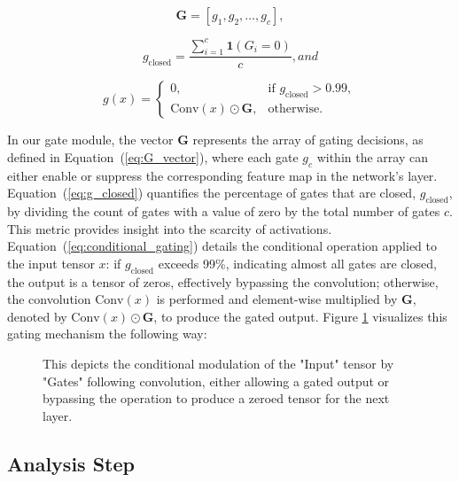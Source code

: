 \documentclass[runningheads]{llncs}
\begin{document}
\begin{equation}
\mathbf{G} = [g_1, g_2, \ldots, g_c], \label{eq:G_vector}
\end{equation}

\begin{equation}
g_{\text{closed}} = \frac{\sum_{i=1}^{c} \mathbf{1}(G_i = 0)}{c}, and \label{eq:g_closed}
\end{equation}

\begin{equation}
g(x) = 
\begin{cases} 
0, & \text{if } g_{\text{closed}} > 0.99, \\
\text{Conv}(x) \odot \mathbf{G}, & \text{otherwise}.
\end{cases} \label{eq:conditional_gating}
\end{equation}

In our gate module, the vector \(\mathbf{G}\) represents the array of gating decisions, as defined in Equation~(\ref{eq:G_vector}), where each gate \(g_c\) within the array can either enable or suppress the corresponding feature map in the network’s layer. Equation~(\ref{eq:g_closed}) quantifies the percentage of gates that are closed, \(g_{\text{closed}}\), by dividing the count of gates with a value of zero by the total number of gates \(c\). This metric provides insight into the scarcity of activations. Equation~(\ref{eq:conditional_gating}) details the conditional operation applied to the input tensor \(x\): if \(g_{\text{closed}}\) exceeds 99\%, indicating almost all gates are closed, the output is a tensor of zeros, effectively bypassing the convolution; otherwise, the convolution \(\text{Conv}(x)\) is performed and element-wise multiplied by \(\mathbf{G}\), denoted by \(\text{Conv}(x) \odot \mathbf{G}\), to produce the gated output. Figure \ref{fig:gating_mechanism} visualizes this gating mechanism the following way:

\begin{figure}[ht]
\centering

\caption{This depicts the conditional modulation of the "Input" tensor by "Gates" following convolution, either allowing a gated output or bypassing the operation to produce a zeroed tensor for the next layer.}
\label{fig:gating_mechanism}
\end{figure}

\subsection{Analysis Step}
\end{document}

